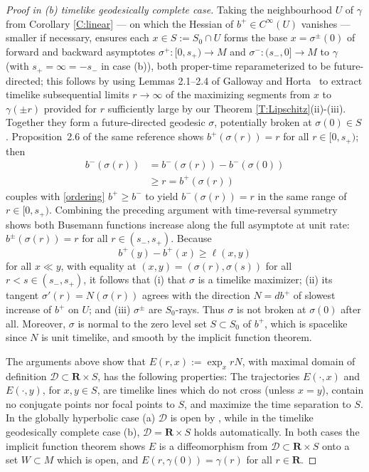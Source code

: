 \documentclass[12pt]{amsart}
\newcommand{\R}{{\mathbf R}}
\begin{document}
\begin{proof}[Proof in {(b) timelike geodesically complete} case]
Taking the neighbourhood $U$ of $\gamma$ from Corollary \ref{C:linear} --- on which the Hessian of $b^+ \in C^{\infty}(U)$ vanishes --- 
smaller if necessary,
ensures each $x \in S:=S_0 \cap U$ forms the 
base $x=\sigma^\pm(0)$ of forward and backward asymptotes $\sigma^+:[0,s_+)\longrightarrow M$
and $\sigma^-:(s_-,0] \longrightarrow M$ to $\gamma$ (with $s_+=\infty=-s_-$ in case (b)),
both proper-time reparameterized to be future-directed;
 this follows by using Lemmas 2.1--2.4 of Galloway and Horta~\cite{GallowayHorta96} to extract timelike subsequential limits $r\to \infty$ of the maximizing segments from $x$ to $\gamma(\pm r)$ provided for $r$ sufficiently large by our Theorem \ref{T:Lipschitz}(ii)-(iii).
Together they form a future-directed geodesic $\sigma$, potentially broken at $\sigma(0)\in S$.  Proposition~2.6 of the same reference shows 
$b^+(\sigma(r))=r$ for all $r \in [0,s_+)$;
then
\begin{align*}
b^-(\sigma(r)) 
&= b^-(\sigma(r)) - b^-(\sigma(0))
\\& \ge r = b^+(\sigma(r))
\end{align*}
couples with \eqref{ordering} $b^+ \ge b^-$ 
to yield $b^-(\sigma(r))=r$ in the same range 
of $r \in [0,s_+)$.
Combining the preceding argument with time-reversal symmetry shows both Busemann functions
increase along the full asymptote at unit rate: $b^\pm(\sigma(r))=r$ for all $r \in (s_-,s_+)$. 
Because
$$
b^+(y)-b^+(x) \ge \ell(x,y)
$$
for all $x \ll y$,  with equality at $(x,y)=(\sigma(r),\sigma(s))$ for all $r<s\in (s_-,s_+)$,  it follows that (i) that $\sigma$ is a timelike maximizer;
(ii) its tangent $\sigma'(r)=N(\sigma(r))$ agrees with the 
direction $N=db^+$ of slowest increase of $b^+$ on $U$;
and (iii) $\sigma^\pm$ are $S_0$-rays.
 Thus $\sigma$ is not broken at $\sigma(0)$ after all.  Moreover,  $\sigma$
is normal to the zero level set  $S \subset S_0$ of $b^+$, which is spacelike since $N$ is unit timelike, and smooth by the implicit function theorem.

The arguments above show that $E(r,x):=\exp_x rN$, with maximal domain of definition $\mathcal{D} \subset \R \times S$, has the following properties: The trajectories $E(\cdot,x)$ and $E(\cdot,y)$, for $x,y \in S$, are timelike lines which do not cross (unless $x=y$), contain no conjugate points nor focal points to $S$, and maximize the time separation to $S$.  In {the globally hyperbolic} case (a) $\mathcal{D}$ is open
by \cite[Proposition 9.7]{BeemEhrlichEasley96}, while in {the timelike geodesically complete} case
(b), $\mathcal{D} = \R \times S$ holds automatically.
In both cases the implicit function theorem shows $E$ is a diffeomorphism from $ \mathcal{D} \subset \R \times S$ onto a set $W \subset M$ which is open, 
and $E(r,\gamma(0))=\gamma(r)$ for all $r \in \R$.


\end{proof}
\end{document}
